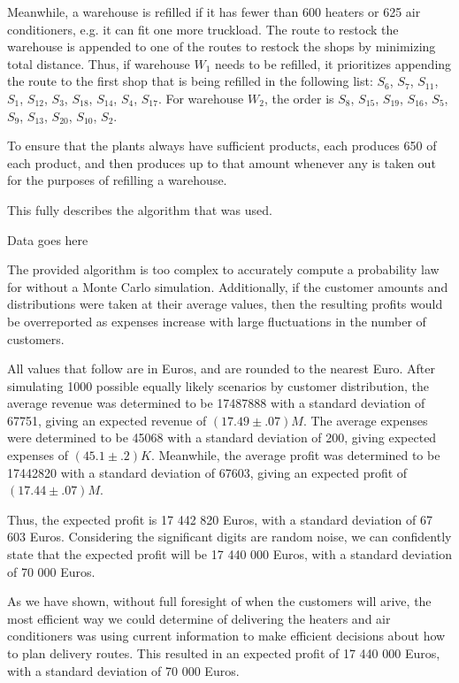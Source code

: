 \begin{paper}
Meanwhile, a warehouse is refilled if it has fewer than 600 heaters or 625 air conditioners, e.g. it can fit one more truckload.
The route to restock the warehouse is appended to one of the routes to restock the shops by minimizing total distance.
Thus, if warehouse $W_1$ needs to be refilled, it prioritizes appending the route to the first shop that is being refilled in the following list: $S_6$, $S_7$, $S_{11}$, $S_1$, $S_{12}$, $S_3$, $S_{18}$, $S_{14}$, $S_4$, $S_{17}$.
For warehouse $W_2$, the order is $S_8$, $S_{15}$, $S_{19}$, $S_{16}$, $S_5$, $S_9$, $S_{13}$, $S_{20}$, $S_{10}$, $S_2$.

To ensure that the plants always have sufficient products, each produces 650 of each product, and then produces up to that amount whenever any is taken out for the purposes of refilling a warehouse.

This fully describes the algorithm that was used.


Data goes here


The provided algorithm is too complex to accurately compute a probability law for without a Monte Carlo simulation.
Additionally, if the customer amounts and distributions were taken at their average values, then the resulting profits would be overreported as expenses increase with large fluctuations in the number of customers.

All values that follow are in Euros, and are rounded to the nearest Euro.
After simulating 1000 possible equally likely scenarios by customer distribution, the average revenue was determined to be \SI{17487888}{} with a standard deviation of \SI{67751}{}, giving an expected revenue of $(17.49\pm.07)M$.
The average expenses were determined to be \SI{45068}{} with a standard deviation of \SI{200}{}, giving expected expenses of $(45.1\pm.2)K$.
Meanwhile, the average profit was determined to be \SI{17442820}{} with a standard deviation of \SI{67603}{}, giving an expected profit of $(17.44\pm.07)M$.

Thus, the expected profit is 17 442 820 Euros, with a standard deviation of 67 603 Euros.
Considering the significant digits are random noise, we can confidently state that the expected profit will be 17 440 000 Euros, with a standard deviation of 70 000 Euros.


As we have shown, without full foresight of when the customers will arive, the most efficient way we could determine of delivering the heaters and air conditioners was using current information to make efficient decisions about how to plan delivery routes.
This resulted in an expected profit of 17 440 000 Euros, with a standard deviation of 70 000 Euros.


\end{paper}
